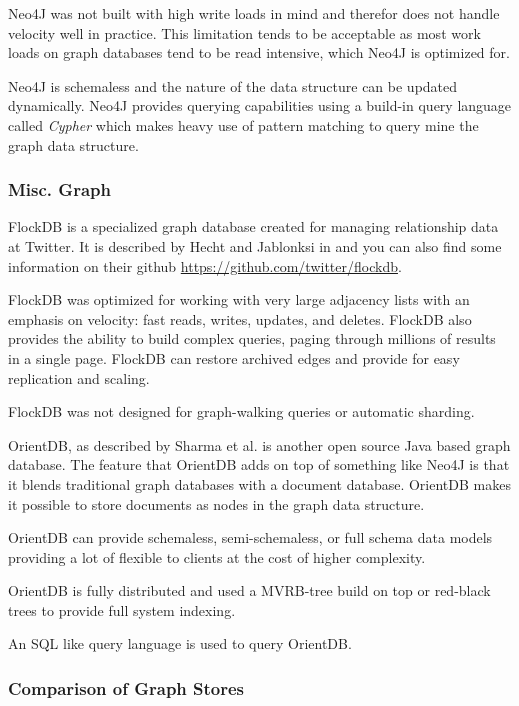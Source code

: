 \documentclass[]{article}
\begin{document}
Neo4J was not built with high write loads in mind and therefor does not handle velocity well in practice. This limitation tends to be acceptable as most work loads on graph databases tend to be read intensive, which Neo4J is optimized for. 

Neo4J is schemaless and the nature of the data structure can be updated dynamically\cite{sharma_extended_2015}. Neo4J provides querying capabilities using a build-in query language called \textit{Cypher} which makes heavy use of pattern matching to query mine the graph data structure.

\subsubsection{Misc. Graph}\label{sssec:misc-graph}
FlockDB is a specialized graph database created for managing relationship data at Twitter. It is described by Hecht and Jablonksi in \cite{hecht_nosql_2011} and you can also find some information on their github \url{https://github.com/twitter/flockdb}.

FlockDB was optimized for working with very large adjacency lists with an emphasis on velocity: fast reads, writes, updates, and deletes. FlockDB also provides the ability to build complex queries, paging through millions of results in a single page. FlockDB can restore archived edges and provide for easy replication and scaling. 

FlockDB was not designed for graph-walking queries or automatic sharding.

OrientDB, as described by Sharma et al.\cite{sharma_extended_2015} is another open source Java based graph database. The feature that OrientDB adds on top of something like Neo4J is that it blends traditional graph databases with a document database. OrientDB makes it possible to store documents as nodes in the graph data structure.

OrientDB can provide schemaless, semi-schemaless, or full schema data models providing a lot of flexible to clients at the cost of higher complexity.

OrientDB is fully distributed and used a MVRB-tree build on top or red-black trees to provide full system indexing.

An SQL like query language is used to query OrientDB.


\subsubsection{Comparison of Graph Stores}
\end{document}
